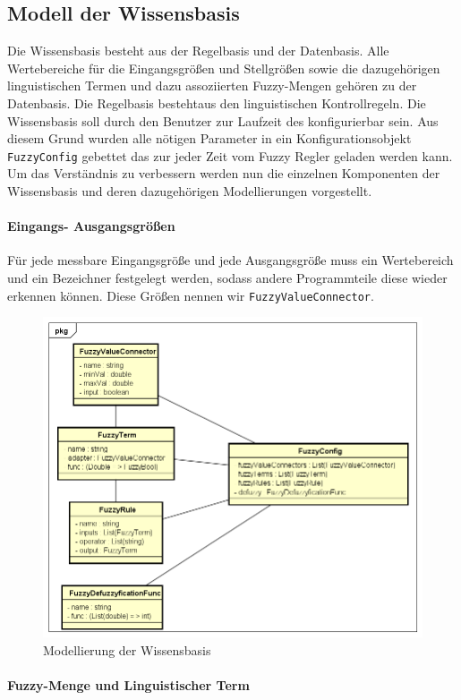 \documentclass[12pt,a4paper,bibliography=totocnumbered,listof=totocnumbered, abstracton]{scrartcl}
\def\code#1{\texttt{#1}}
\theoremstyle{Umgebung}
\begin{document}
\subsection{Modell der Wissensbasis}

Die Wissensbasis besteht aus der Regelbasis und der Datenbasis. Alle Wertebereiche für die Eingangsgrößen und Stellgrößen sowie die dazugehörigen linguistischen Termen und dazu assoziierten Fuzzy-Mengen gehören zu der Datenbasis. Die Regelbasis bestehtaus den linguistischen Kontrollregeln. Die Wissensbasis soll durch den Benutzer zur Laufzeit des konfigurierbar sein. Aus diesem Grund wurden alle nötigen Parameter in ein Konfigurationsobjekt \code{FuzzyConfig} gebettet das zur jeder Zeit vom Fuzzy Regler geladen werden kann. Um das Verständnis zu verbessern werden nun die einzelnen Komponenten der Wissensbasis und deren dazugehörigen Modellierungen vorgestellt.

\paragraph{Eingangs- Ausgangsgrößen}

Für jede messbare Eingangsgröße und jede Ausgangsgröße muss ein Wertebereich und ein Bezeichner festgelegt werden, sodass andere Programmteile diese wieder erkennen können. Diese Größen nennen wir \code{FuzzyValueConnector}.

\begin{figure}
	\centering
	\includegraphics[width=0.7\linewidth]{img/practical/valueconnector}
	\caption{Modellierung der Wissensbasis}
	\label{fig:valueconnector}
\end{figure}

\paragraph{Fuzzy-Menge und Linguistischer Term}
\end{document}
